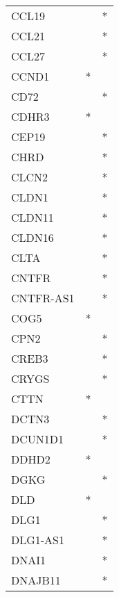 \begin{longtable}{lcc}
CCL19            &                &          * \\
CCL21            &                &          * \\
CCL27            &                &          * \\
CCND1            &              * &            \\
CD72             &                &          * \\
CDHR3            &              * &            \\
CEP19            &                &          * \\
CHRD             &                &          * \\
CLCN2            &                &          * \\
CLDN1            &                &          * \\
CLDN11           &                &          * \\
CLDN16           &                &          * \\
CLTA             &                &          * \\
CNTFR            &                &          * \\
CNTFR-AS1        &                &          * \\
COG5             &              * &            \\
CPN2             &                &          * \\
CREB3            &                &          * \\
CRYGS            &                &          * \\
CTTN             &              * &            \\
DCTN3            &                &          * \\
DCUN1D1          &                &          * \\
DDHD2            &              * &            \\
DGKG             &                &          * \\
DLD              &              * &            \\
DLG1             &                &          * \\
DLG1-AS1         &                &          * \\
DNAI1            &                &          * \\
DNAJB11          &                &          * \\

\end{longtable}
